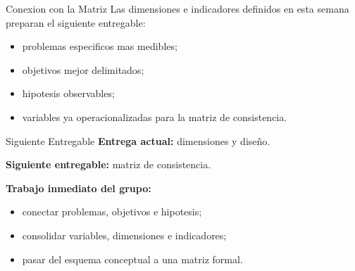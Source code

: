 \documentclass[aspectratio=169,11pt]{beamer}
\begin{document}
\begin{frame}{Conexion con la Matriz}
\justifying
Las dimensiones e indicadores definidos en esta semana preparan el siguiente entregable:

\vspace{0.6em}

\begin{itemize}
  \item problemas especificos mas medibles;
  \item objetivos mejor delimitados;
  \item hipotesis observables;
  \item variables ya operacionalizadas para la matriz de consistencia.
\end{itemize}
\end{frame}

\begin{frame}{Siguiente Entregable}
\justifying
\textbf{Entrega actual:} dimensiones y diseño.

\vspace{0.7em}

\textbf{Siguiente entregable:} matriz de consistencia.

\vspace{0.7em}

\textbf{Trabajo inmediato del grupo:}
\begin{itemize}
  \item conectar problemas, objetivos e hipotesis;
  \item consolidar variables, dimensiones e indicadores;
  \item pasar del esquema conceptual a una matriz formal.
\end{itemize}
\end{frame}
\end{document}
